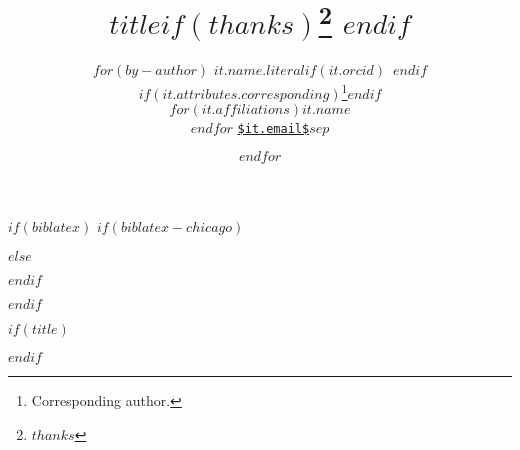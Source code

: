 $if(biblatex)$
$if(biblatex-chicago)$
\usepackage[$if(biblio-style)$$biblio-style$,$endif$$for(biblatexoptions)$$biblatexoptions$$sep$,$endfor$]{biblatex-chicago}
$else$
\usepackage[$if(biblio-style)$style=$biblio-style$,$endif$$for(biblatexoptions)$$biblatexoptions$$sep$,$endfor$]{biblatex}
$endif$

\setlength\bibitemsep{0pt}  %
\renewcommand*{\bibfont}{\footnotesize}  %
\setlength\bibhang{\parindent}  %



$endif$


$if(title)$
\title{\bigskip \bigskip $title$$if(thanks)$\thanks{$thanks$} $endif$ }
$endif$

\author{
$for(by-author)$
{\large $it.name.literal$$if(it.orcid)$~$endif$}%
$if(it.attributes.corresponding)$\thanks{Corresponding author.}$endif$ \\%
$for(it.affiliations)${\normalsize\emph{$it.name$}} \\$endfor$%
{\footnotesize \texttt{\url{$it.email$}}}\vspace*{0.2in}\newline $sep$ \and
$endfor$
}

\date{}

